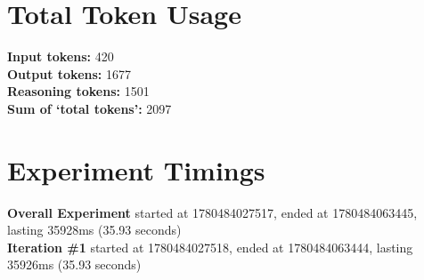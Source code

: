 \documentclass{article}
\begin{document}
\section*{Total Token Usage}
\textbf{Input tokens: }420
\\\textbf{Output tokens: }1677
\\\textbf{Reasoning tokens: }1501
\\\textbf{Sum of `total tokens': }2097
\section*{Experiment Timings}
\textbf{Overall Experiment} started at 1780484027517, ended at 1780484063445, lasting 35928ms (35.93 seconds)
\\\textbf{Iteration \#1} started at 1780484027518, ended at 1780484063444, lasting 35926ms (35.93 seconds)
\end{document}
